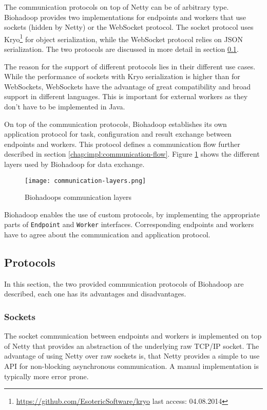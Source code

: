 The communication protocols on top of Netty can be of arbitrary type. Biohadoop provides two implementations for endpoints and workers that use sockets (hidden by Netty) or the WebSocket protocol. The socket protocol uses Kryo\footnote{\url{https://github.com/EsotericSoftware/kryo} last access: 04.08.2014} for object serialization, while the WebSocket protocol relies on JSON serialization. The two protocols are discussed in more detail in section \ref{chap:impl:protocols}.

The reason for the support of different protocols lies in their different use cases. While the performance of sockets with Kryo serialization is higher than for WebSockets, WebSockets have the advantage of great compatibility and broad support in different languages. This is important for external workers as they don't have to be implemented in Java.

On top of the communication protocols, Biohadoop establishes its own application protocol for task, configuration and result exchange between endpoints and workers. This protocol defines a communication flow further described in section \ref{chap:impl:communication-flow}. Figure \ref{fig:communication-layers} shows the different layers used by Biohadoop for data exchange.

\begin{figure}
  \centering
  \texttt{[image: communication-layers.png]}
  \caption[Biohadoops communication layers]{Biohadoops communication layers}
  \label{fig:communication-layers}
\end{figure}

Biohadoop enables the use of custom protocols, by implementing the appropriate parts of \texttt{Endpoint} and \texttt{Worker} interfaces. Corresponding endpoints and workers have to agree about the communication and application protocol.

\subsection{Protocols}
\label{chap:impl:protocols}
In this section, the two provided communication protocols of Biohadoop are described, each one has its advantages and disadvantages.

\subsubsection{Sockets}
The socket communication between endpoints and workers is implemented on top of Netty that provides an abstraction of the underlying raw TCP/IP socket. The advantage of using Netty over raw sockets is, that Netty provides a simple to use API for non-blocking asynchronous communication. A manual implementation is typically more error prone.

